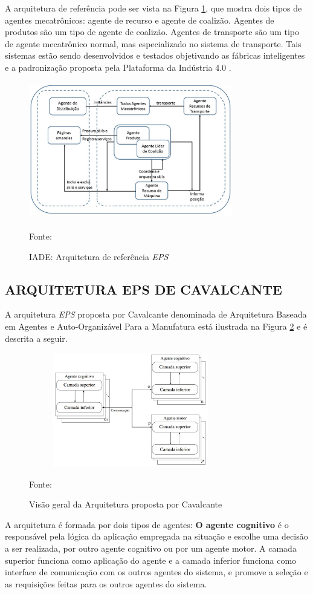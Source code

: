 \documentclass[10pt,letterpaper,twocolumn]{IEEEtran}
\begin{document}
 A arquitetura de referência pode ser vista na Figura \ref{fig:arq_referencia_eps}, que mostra dois tipos de agentes mecatrônicos: agente de recurso e agente de coalizão. Agentes de produtos são um tipo de  agente de coalizão. Agentes de transporte são um tipo de agente mecatrônico normal, mas especializado no sistema de  transporte. Tais sistemas estão sendo desenvolvidos e testados objetivando as fábricas inteligentes e a padronização proposta pela  Plataforma \cite{BITKOM2015} da Indústria 4.0 \cite{DRATH2014}.
 
\begin{figure}[t]
	\centering
	\includegraphics[width=8.9cm, height=6cm]{MeDSE_imagens/F8_1_SIAPE_Arquitetura_EPS.jpg}
	\caption{IADE: Arquitetura de referência \textit{EPS}}
	\label{fig:arq_referencia_eps}
	{\footnotesize{Fonte: \cite{A.L.D.Cavalcante}}}
\end{figure}

\subsection{ARQUITETURA EPS DE CAVALCANTE}

A arquitetura \textit{EPS} proposta por Cavalcante denominada de Arquitetura Baseada em Agentes e Auto-Organizável Para a Manufatura  está ilustrada na Figura \ref{F132} e é descrita a seguir.
\begin{figure}[h!]
	\centering
	\includegraphics[width=8.9cm, height=5cm]{MeDSE_imagens/F132_ARQUITETURA_BAAOPM.jpg} 
	\caption{Visão geral da Arquitetura proposta por Cavalcante}
	\footnotesize{Fonte: \cite{A.L.D.Cavalcante}}
	\label{F132}
\end{figure}
A arquitetura é formada por dois tipos de agentes:
\textbf{O agente cognitivo} é o responsável pela lógica da aplicação empregada na situação e escolhe uma decisão a ser realizada, por outro agente cognitivo ou por um agente motor. A camada superior funciona como aplicação do agente e  a camada inferior funciona como interface de comunicação com os outros agentes do sistema, e promove a seleção e as requisições feitas para os outros agentes do sistema.
\end{document}
